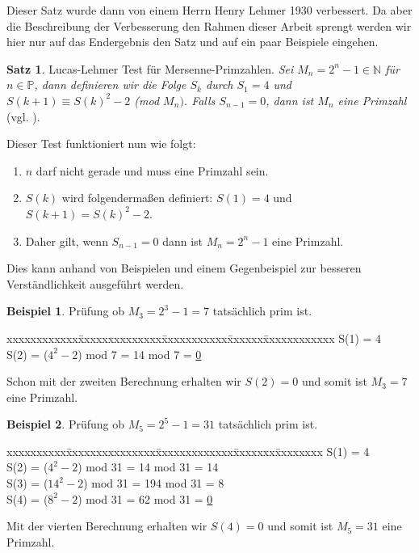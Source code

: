 \documentclass[12pt,a4paper]{article}
\theoremstyle{definition}
\newtheorem{satz}{Satz}[subsection]
\newtheorem{bsp}{Beispiel}[subsection]
\begin{document}
Dieser Satz wurde dann von einem Herrn Henry Lehmer 1930 verbessert.
Da aber die Beschreibung der Verbesserung den Rahmen dieser Arbeit sprengt werden wir hier nur auf das Endergebnis den Satz und auf ein paar Beispiele eingehen.
\begin{satz}{Lucas-Lehmer Test für Mersenne-Primzahlen}.\newline
\textit{Sei $M_n = 2^n-1 \in \mathbb{N}$ für $n \in \mathbb{P}$, dann definieren wir die Folge $S_k$ durch $S_1 = 4$ und $S(k + 1) \equiv S(k)^2 - 2$ (mod $M_n)$. Falls $S_{n-1} = 0$, dann ist $M_n$ eine Primzahl} (vgl. \cite[183]{Crandall2005}).
\end{satz}
Dieser Test funktioniert nun wie folgt:
\begin{enumerate}
    \item $n$ darf nicht gerade und muss eine Primzahl sein.
    \item $S(k)$ wird folgendermaßen definiert: $S(1) = 4$ und $S(k + 1) = S(k)^2 - 2$.
    \item Daher gilt, wenn $S_{n - 1} = 0$ dann ist $M_n = 2^n - 1$ eine Primzahl.
\end{enumerate}

Dies kann anhand von Beispielen und einem Gegenbeispiel zur besseren Verständlichkeit ausgeführt werden.
\begin{bsp}{Prüfung ob $M_3 = 2^3 - 1 = 7$ tatsächlich prim ist}.
\begin{tabbing}
xxxxxxxxxxxx\=xxxxxxxxxxxxxx\=xxxxxxxxxxx\=xxxxxx\=xxxxxxxxxxxx\kill
\> S(1) = 4 \\
\> S(2) = ($4^2 - 2$) \> mod 7 = 14 \> mod 7 \> = \underline{0}
\end{tabbing}
Schon mit der zweiten Berechnung erhalten wir $S(2) = 0$ und somit ist $M_3 = 7$ eine Primzahl.
\end{bsp}

\begin{bsp}{Prüfung ob $M_5 = 2^5 - 1 = 31$ tatsächlich prim ist}.
\begin{tabbing}
xxxxxxxxxx\=xxxxxxxxxxxxxxx\=xxxxxxxxxxxxx\=xxxxxxx\=xxxxxxxx\kill
\> S(1) = 4 \\
\> S(2) = ($4^2 - 2$)  \> mod 31 = 14  \> mod 31 \> = 14 \\
\> S(3) = ($14^2 - 2$) \> mod 31 = 194 \> mod 31 \> = 8 \\
\> S(4) = ($8^2 - 2$)  \> mod 31 = 62  \> mod 31 \> = \underline{0}
\end{tabbing}
Mit der vierten Berechnung erhalten wir $S(4) = 0$ und somit ist $M_5 = 31$ eine Primzahl.
\end{bsp}
\end{document}
